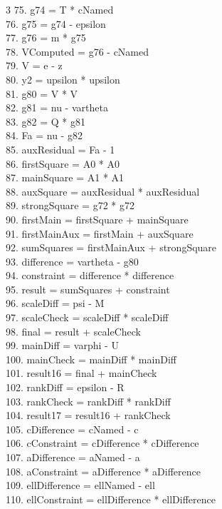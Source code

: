 \documentclass[10pt]{article}
\begin{document}
\begin{multicols}{3}
75. g74 = T * cNamed\\
76. g75 = g74 - epsilon\\
77. g76 = m * g75\\
78. VComputed = g76 - cNamed\\
79. V = e - z\\
80. y2 = upsilon * upsilon\\
81. g80 = V * V\\
82. g81 = nu - vartheta\\
83. g82 = Q * g81\\
84. Fa = nu - g82\\
85. auxResidual = Fa - 1\\
86. firstSquare = A0 * A0\\
87. mainSquare = A1 * A1\\
88. auxSquare = auxResidual * auxResidual\\
89. strongSquare = g72 * g72\\
90. firstMain = firstSquare + mainSquare\\
91. firstMainAux = firstMain + auxSquare\\
92. sumSquares = firstMainAux + strongSquare\\
93. difference = vartheta - g80\\
94. constraint = difference * difference\\
95. result = sumSquares + constraint\\
96. scaleDiff = psi - M\\
97. scaleCheck = scaleDiff * scaleDiff\\
98. final = result + scaleCheck\\
99. mainDiff = varphi - U\\
100. mainCheck = mainDiff * mainDiff\\
101. result16 = final + mainCheck\\
102. rankDiff = epsilon - R\\
103. rankCheck = rankDiff * rankDiff\\
104. result17 = result16 + rankCheck\\
105. cDifference = cNamed - c\\
106. cConstraint = cDifference * cDifference\\
107. aDifference = aNamed - a\\
108. aConstraint = aDifference * aDifference\\
109. ellDifference = ellNamed - ell\\
110. ellConstraint = ellDifference * ellDifference\\

\end{multicols}
\end{document}

